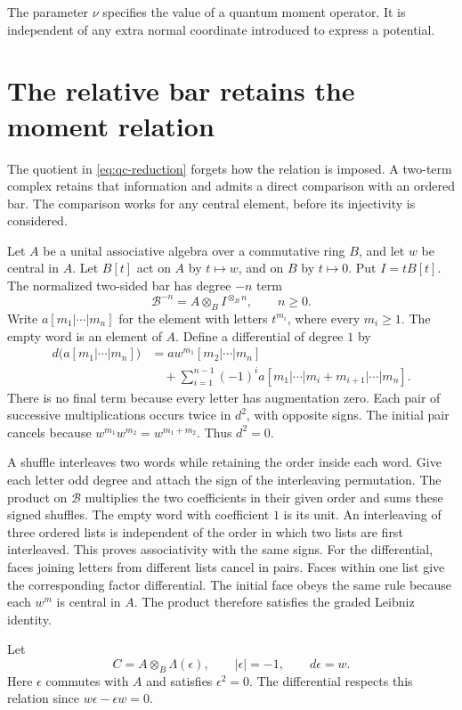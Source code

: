 The parameter $\nu$ specifies the value of a quantum moment operator.
It is independent of any extra normal coordinate introduced to express a potential.

\section{The relative bar retains the moment relation}

The quotient in \eqref{eq:qc-reduction} forgets how the relation is imposed.
A two-term complex retains that information and admits a direct comparison with an ordered bar.
The comparison works for any central element, before its injectivity is considered.

Let $A$ be a unital associative algebra over a commutative ring $B$, and let $w$ be central in $A$.
Let $B[t]$ act on $A$ by $t\mapsto w$, and on $B$ by $t\mapsto0$.
Put $I=tB[t]$.
The normalized two-sided bar has degree $-n$ term
\[
 \mathcal B^{-n}=A\otimes_B I^{\otimes_B n},\qquad n\ge0.
\]
Write $a[m_1|\cdots|m_n]$ for the element with letters $t^{m_i}$, where every $m_i\ge1$.
The empty word is an element of $A$.
Define a differential of degree $1$ by
\begin{align*}
 d\bigl(a[m_1|\cdots|m_n]\bigr)
 &=aw^{m_1}[m_2|\cdots|m_n]\\
 &\quad+\sum_{i=1}^{n-1}(-1)^i
 a[m_1|\cdots|m_i+m_{i+1}|\cdots|m_n].
\end{align*}
There is no final term because every letter has augmentation zero.
Each pair of successive multiplications occurs twice in $d^2$, with opposite signs.
The initial pair cancels because $w^{m_1}w^{m_2}=w^{m_1+m_2}$.
Thus $d^2=0$.

A shuffle interleaves two words while retaining the order inside each word.
Give each letter odd degree and attach the sign of the interleaving permutation.
The product on $\mathcal B$ multiplies the two coefficients in their given order and sums these signed shuffles.
The empty word with coefficient $1$ is its unit.
An interleaving of three ordered lists is independent of the order in which two lists are first interleaved.
This proves associativity with the same signs.
For the differential, faces joining letters from different lists cancel in pairs.
Faces within one list give the corresponding factor differential.
The initial face obeys the same rule because each $w^m$ is central in $A$.
The product therefore satisfies the graded Leibniz identity.

Let
\[
 C=A\otimes_B\Lambda(\epsilon),\qquad |\epsilon|=-1,
 \qquad d\epsilon=w.
\]
Here $\epsilon$ commutes with $A$ and satisfies $\epsilon^2=0$.
The differential respects this relation since $w\epsilon-\epsilon w=0$.

